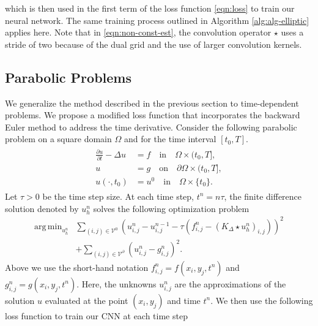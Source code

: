 \documentclass[preprint,12pt]{elsarticle}
\DeclareMathOperator*{\argmin}{arg\,min}
\begin{document}
which is then used in the first term of the loss function \eqref{eqn:loss} to train our neural network. The same training process outlined in Algorithm \ref{alg:alg-elliptic} applies here. Note that in \eqref{eqn:non-const-est}, the convolution operator $\star$ uses a stride of two because of the dual grid and the use of larger convolution kernels.

\subsection{Parabolic Problems}
We generalize the method described in the previous section to time-dependent problems. We propose a modified loss function that incorporates the backward Euler method to address the time derivative. Consider the following parabolic problem on a square domain $\Omega$ and for the time interval $[t_0,T]$. 
\begin{align}
\label{eqn:parabolic}
    \begin{split}
    \frac{\partial u}{\partial t} - \Delta u &= f \quad \mbox{in}\quad  \Omega \times (t_0, T], \\
    u &= g \quad\mbox{on}\quad \partial \Omega \times (t_0, T], \\
    u(\cdot,t_0)  &= u^0 \quad\mbox{in}\quad \Omega\times \{t_0\}.
    \end{split}
\end{align}
Let $\tau>0$ be the time step size. At each time step, $t^n = n\tau$, the finite difference solution denoted by $u_h^n$ solves 
the following optimization problem 
\begin{align} \label{eqn:timeopt}
    \argmin_{u_h^n} & \sum_{(i,j) \in \mathcal{V}^0} \left(u^n_{i,j} - u^{n-1}_{i,j} - \tau\left(f_{i,j}^n - \left(K_{\Delta} \star u_h^n\right)_{i,j}\right)\right)^2 \nonumber\\
    &+ \sum_{(i,j) \in \mathcal{V}^\partial} \left(u^n_{i,j} - g_{i,j}^n\right)^2.
\end{align}
Above we use the short-hand notation $f_{i,j}^n = f(x_i,y_j,t^n)$ and $g_{i,j}^n = g(x_i,y_j,t^n)$. Here, the unknowns $u_{i,j}^n$ are the approximations of the solution $u$ evaluated at the point $(x_i, y_j)$ and time $t^n$. We then use the following loss function to train our CNN at each time step
\end{document}
